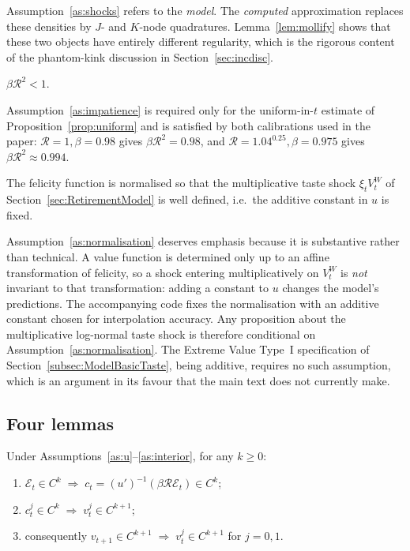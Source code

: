 Assumption~\ref{as:shocks} refers to the \emph{model}. The \emph{computed}
approximation replaces these densities by $J$- and $K$-node quadratures.
Lemma~\ref{lem:mollify} shows that these two objects have entirely different
regularity, which is the rigorous content of the phantom-kink discussion in
Section~\ref{sec:incdisc}.

\begin{assumption}[Impatience]
\label{as:impatience}
$\beta\mathcal{R}^{2}<1$.
\end{assumption}

Assumption~\ref{as:impatience} is required only for the uniform-in-$t$ estimate of
Proposition~\ref{prop:uniform} and is satisfied by both calibrations used in the
paper: $\mathcal{R}=1,\beta=0.98$ gives $\beta\mathcal{R}^2=0.98$, and
$\mathcal{R}=1.04^{0.25},\beta=0.975$ gives $\beta\mathcal{R}^2\approx 0.994$.

\begin{assumption}
\label{as:normalisation}
The felicity function is normalised so that the multiplicative taste shock
$\xi_t V_t^{W}$ of Section~\ref{sec:RetirementModel} is well defined, i.e.\ the
additive constant in $u$ is fixed.
\end{assumption}

Assumption~\ref{as:normalisation} deserves emphasis because it is substantive rather
than technical. A value function is determined only up to an affine transformation of
felicity, so a shock entering multiplicatively on $V_t^{W}$ is \emph{not} invariant to
that transformation: adding a constant to $u$ changes the model's predictions. The
accompanying code fixes the normalisation with an additive constant chosen for
interpolation accuracy. Any proposition about the multiplicative log-normal taste
shock is therefore conditional on Assumption~\ref{as:normalisation}. The Extreme Value
Type~I specification of Section~\ref{subsec:ModelBasicTaste}, being additive, requires
no such assumption, which is an argument in its favour that the main text does not
currently make.

\subsection{Four lemmas}
\label{subsec:smooth_lemmas}

\begin{lemma}
\label{lem:transfer}
Under Assumptions~\ref{as:u}--\ref{as:interior}, for any $k\ge 0$:
\begin{enumerate}
    \item $\mathcal{E}_t\in C^{k}\;\Longrightarrow\;c_t=(u')^{-1}(\beta\mathcal{R}\mathcal{E}_t)\in C^{k}$;
    \item $c_t^{j}\in C^{k}\;\Longrightarrow\;v_t^{j}\in C^{k+1}$;
    \item consequently $v_{t+1}\in C^{k+1}\;\Longrightarrow\;v_t^{j}\in C^{k+1}$ for $j=0,1$.
\end{enumerate}
\end{lemma}

